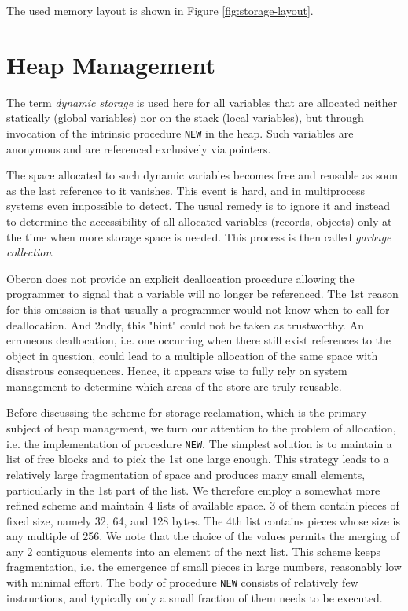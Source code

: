 The used memory layout is shown in Figure \ref{fig:storage-layout}.

\section{Heap Management}
The term \emph{dynamic storage} is used here for all variables that are allocated neither
statically (global variables) nor on the stack (local variables), but through invocation
of the intrinsic procedure \verb|NEW| in the heap. Such variables are anonymous and are
referenced exclusively via pointers.

The space allocated to such dynamic variables becomes free and reusable as soon as the last
reference to it vanishes. This event is hard, and in multiprocess systems even impossible
to detect. The usual remedy is to ignore it and instead to determine the accessibility of
all allocated variables (records, objects) only at the time when more storage space is needed.
This process is then called \emph{garbage collection}.

Oberon does not provide an explicit deallocation procedure allowing the programmer to signal
that a variable will no longer be referenced. The 1st reason for this omission is that
usually a programmer would not know when to call for deallocation. And 2ndly, this "hint"
could not be taken as trustworthy. An erroneous deallocation, i.e. one occurring when there
still exist references to the object in question, could lead to a multiple allocation of
the same space with disastrous consequences. Hence, it appears wise to fully rely on system
management to determine which areas of the store are truly reusable.

Before discussing the scheme for storage reclamation, which is the primary subject of
heap management, we turn our attention to the problem of allocation, i.e. the implementation
of procedure \verb|NEW|. The simplest solution is to maintain a list of free blocks and to
pick the 1st one large enough. This strategy leads to a relatively large fragmentation of
space and produces many small elements, particularly in the 1st part of the list. We
therefore employ a somewhat more refined scheme and maintain 4 lists of available space.
3 of them contain pieces of fixed size, namely 32, 64, and 128 bytes. The 4th list contains
pieces whose size is any multiple of 256. We note that the choice of the values permits the
merging of any 2 contiguous elements into an element of the next list. This scheme keeps
fragmentation, i.e. the emergence of small pieces in large numbers, reasonably low with
minimal effort. The body of procedure \verb|NEW| consists of relatively few instructions,
and typically only a small fraction of them needs to be executed.

